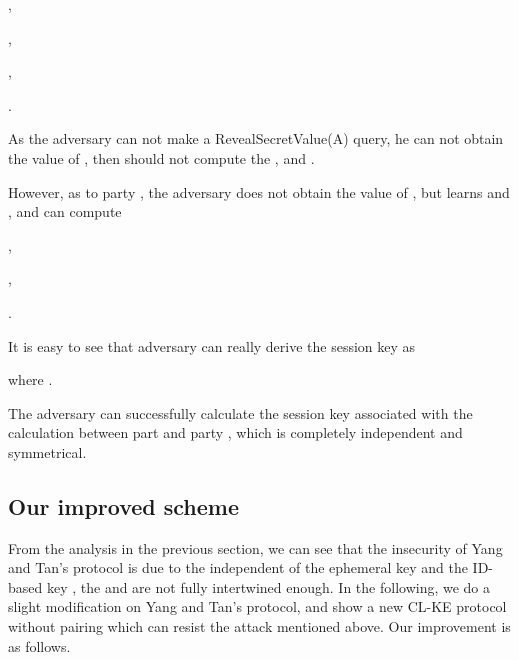 \documentclass[final,1p,times,twocolumn]{elsarticle}
\begin{document}
,

\vspace{0.1cm}

,

\vspace{0.1cm}

,

\vspace{0.1cm}

.

\vspace{0.1cm}

As the adversary can not make a RevealSecretValue(A) query, he can not obtain the value of , then should not compute the ,  and .

\vspace{0.1cm}

However, as to party , the adversary does not obtain the value of , but learns  and , and can compute

\vspace{0.1cm}

,

\vspace{0.1cm}

,

\vspace{0.1cm}

.

\vspace{0.1cm}

It is easy to see that adversary can really derive the session key as

\vspace{0.1cm}

 

 \vspace{0.1cm}

 where .

 \vspace{0.1cm}

The adversary can successfully calculate the session key associated with the calculation between part  and party , which is completely independent and symmetrical.
 \vspace{0.3cm}


\subsection{Our improved scheme}
\label{4.2}

  \vspace{0.1cm}

 From the analysis in the previous section, we can see that the insecurity of Yang and Tan's protocol is due to the independent of the ephemeral key  and the ID-based key  , the  and  are not fully intertwined enough. In the following, we do a slight modification on Yang and Tan's protocol, and show a new CL-KE protocol without pairing which can resist the attack mentioned above. Our improvement is as follows.
\end{document}

